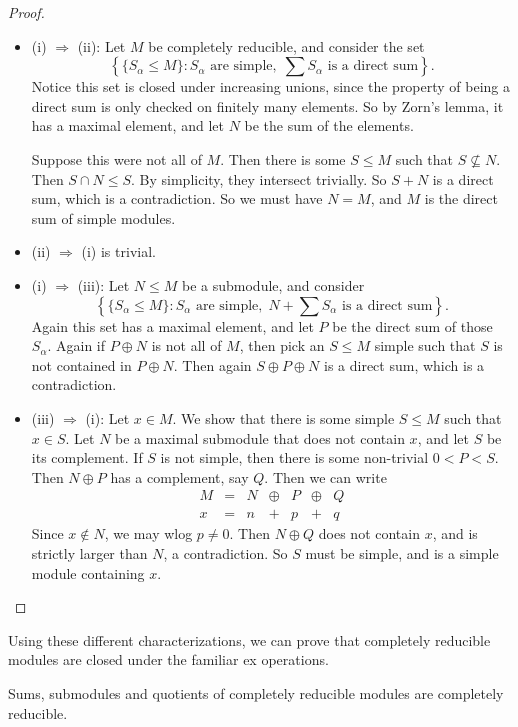 \documentclass[a4paper]{article}
\begin{document}
\begin{proof}\leavevmode
  \begin{itemize}
    \item (i) $\Rightarrow$ (ii): Let $M$ be completely reducible, and consider the set
      \[
        \left\{\{S_\alpha \leq M\} : S_\alpha\text{ are simple},\; \sum S_\alpha\text{ is a direct sum}\right\}.
      \]
      Notice this set is closed under increasing unions, since the property of being a direct sum is only checked on finitely many elements. So by Zorn's lemma, it has a maximal element, and let $N$ be the sum of the elements.

      Suppose this were not all of $M$. Then there is some $S \leq M$ such that $S \not\subseteq N$. Then $S \cap N \leq S$. By simplicity, they intersect trivially. So $S + N$ is a direct sum, which is a contradiction. So we must have $N = M$, and $M$ is the direct sum of simple modules.
    \item (ii) $\Rightarrow$ (i) is trivial.
    \item (i) $\Rightarrow$ (iii): Let $N \leq M$ be a submodule, and consider
      \[
        \left\{\{S_\alpha \leq M\} : S_\alpha\text{ are simple},\; N + \sum S_\alpha\text{ is a direct sum}\right\}.
      \]
      Again this set has a maximal element, and let $P$ be the direct sum of those $S_\alpha$. Again if $P \oplus N$ is not all of $M$, then pick an $S \leq M$ simple such that $S$ is not contained in $P \oplus N$. Then again $S \oplus P \oplus N$ is a direct sum, which is a contradiction.
    \item (iii) $\Rightarrow$ (i): Let $x \in M$. We show that there is some simple $S \leq M$ such that $x \in S$. Let $N$ be a maximal submodule that does not contain $x$, and let $S$ be its complement. If $S$ is not simple, then there is some non-trivial $0 < P < S$. Then $N \oplus P$ has a complement, say $Q$. Then we can write
      \[
        \begin{array}{ccccccc}
          M &=& N &\oplus& P &\oplus& Q\\
          x &=& n &+& p &+& q
        \end{array}
      \]
      Since $x \not\in N$, we may wlog $p \not= 0$. Then $N \oplus Q$ does not contain $x$, and is strictly larger than $N$, a contradiction. So $S$ must be simple, and is a simple module containing $x$.
  \end{itemize}
\end{proof}

Using these different characterizations, we can prove that completely reducible modules are closed under the familiar ex operations.
\begin{prop}
  Sums, submodules and quotients of completely reducible modules are completely reducible.
\end{prop}
\end{document}
